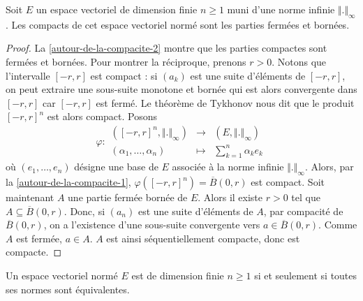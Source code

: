   \begin{proposition}
    \label{autour-de-la-compacite-3}
    Soit $E$ un espace vectoriel de dimension finie $n \geq 1$ muni d'une norme infinie $\Vert . \Vert_\infty$. Les compacts de cet espace vectoriel normé sont les parties fermées et bornées.
  \end{proposition}

  \begin{proof}
    La \cref{autour-de-la-compacite-2} montre que les parties compactes sont fermées et bornées. Pour montrer la réciproque, prenons $r > 0$. Notons que l'intervalle $[-r,r]$ est compact : si $(a_k)$ est une suite d'éléments de $[-r,r]$, on peut extraire une sous-suite monotone et bornée qui est alors convergente dans $[-r,r]$ car $[-r,r]$ est fermé. Le théorème de Tykhonov nous dit que le produit $[-r,r]^n$ est alors compact.
    \newpar
    Posons
    \[
      \varphi :
      \begin{array}{ccc}
        ([-r, r]^n, \Vert . \Vert_\infty) &\rightarrow& (E, \Vert . \Vert_\infty) \\
        (\alpha_1, \dots, \alpha_n) &\mapsto& \sum_{k=1}^n \alpha_k e_k
      \end{array}
    \]
    où $(e_1, \dots, e_n)$ désigne une base de $E$ associée à la norme infinie $\Vert . \Vert_\infty$. Alors, par la \cref{autour-de-la-compacite-1}, $\varphi([-r, r]^n) = \overline{B}(0,r)$ est compact.
    \newpar
    Soit maintenant $A$ une partie fermée bornée de $E$. Alors il existe $r > 0$ tel que $A \subseteq \overline{B}(0,r)$. Donc, si $(a_n)$ est une suite d'éléments de $A$, par compacité de $\overline{B}(0,r)$, on a l'existence d'une sous-suite convergente vers $a \in \overline{B}(0,r)$. Comme $A$ est fermée, $a \in A$. $A$ est ainsi séquentiellement compacte, donc est compacte.
  \end{proof}

  \begin{theorem}
    \label{autour-de-la-compacite-4}
    Un espace vectoriel normé $E$ est de dimension finie $n \geq 1$ si et seulement si toutes ses normes sont équivalentes.
  \end{theorem}


